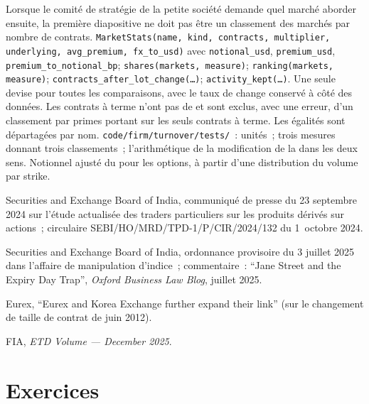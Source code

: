 \begin{build}
 Lorsque le comité de stratégie de la petite société demande
quel marché aborder ensuite, la première diapositive ne doit pas être un classement
des marchés par nombre de contrats.  \texttt{MarketStats(name, kind, contracts, multiplier,
underlying, avg\_premium, fx\_to\_usd)} avec \texttt{notional\_usd},
\texttt{premium\_usd}, \texttt{premium\_to\_notional\_bp};
\texttt{shares(markets, measure)}; \texttt{ranking(markets, measure)};
\texttt{contracts\_after\_lot\_change(\ldots)}; \texttt{activity\_kept(\ldots)}.
 Une seule devise pour toutes les comparaisons, avec le taux de change
conservé à côté des données. Les contrats à terme n'ont pas de  et sont exclus,
avec une erreur, d'un classement par primes portant sur les seuls contrats à terme. Les égalités sont départagées
par nom.
 \texttt{code/firm/turnover/tests/}~: unités~; trois
mesures donnant trois classements~; l'arithmétique de la modification de la  dans les deux sens.
 Notionnel ajusté du  pour les options, à partir d'une distribution
du volume par strike.
\end{build}

\begin{omsources}
\item Securities and Exchange Board of India, communiqué de presse du 23 septembre
2024 sur l'étude actualisée des traders particuliers sur les produits dérivés sur actions~;
circulaire SEBI/HO/MRD/TPD-1/P/CIR/2024/132 du 1~octobre 2024.
\item Securities and Exchange Board of India, ordonnance provisoire du 3 juillet 2025 dans
l'affaire de manipulation d'indice~; commentaire~: ``Jane Street and the Expiry
Day Trap'', \emph{Oxford Business Law Blog}, juillet 2025.
\item Eurex, ``Eurex and Korea Exchange further expand their link'' (sur le
changement de taille de contrat de juin 2012).
\item FIA, \emph{ETD Volume --- December 2025}.
\end{omsources}

\section{Exercices}

